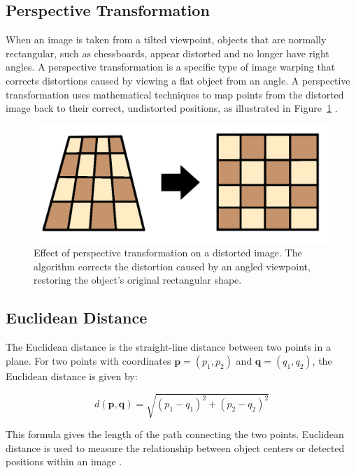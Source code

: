 \subsection*{Perspective Transformation}
\label{subsec:perspective-transformation}

When an image is taken from a tilted viewpoint, objects that are normally rectangular, such as chessboards, appear distorted and no longer have right angles. A perspective transformation is a specific type of image warping that corrects distortions caused by viewing a flat object from an angle. A perspective transformation uses mathematical techniques to map points from the distorted image back to their correct, undistorted positions, as illustrated in Figure~\ref{fig:perspective-transformation} \cite{nvidia:perspective-transform}.

\begin{figure}[h!]
    \centering
    \includegraphics[width=0.75\linewidth]{figures/theory/image-recognition/perspective-transformation.png}
    \caption[Perspective transformation before and after]{Effect of perspective transformation on a distorted image. The algorithm corrects the distortion caused by an angled viewpoint, restoring the object’s original rectangular shape.}
    \label{fig:perspective-transformation}
\end{figure}

\subsection*{Euclidean Distance}
\label{subsec:euclidean-distance}

The Euclidean distance is the straight-line distance between two points in a plane. For two points with coordinates \( \mathbf{p} = (p_1, p_2) \) and \( \mathbf{q} = (q_1, q_2) \), the Euclidean distance is given by:

\[
d(\mathbf{p}, \mathbf{q}) = \sqrt{(p_1 - q_1)^2 + (p_2 - q_2)^2}
\]

This formula gives the length of the path connecting the two points. Euclidean distance is used to measure the relationship between object centers or detected positions within an image \cite{cohen:precalculus}.


